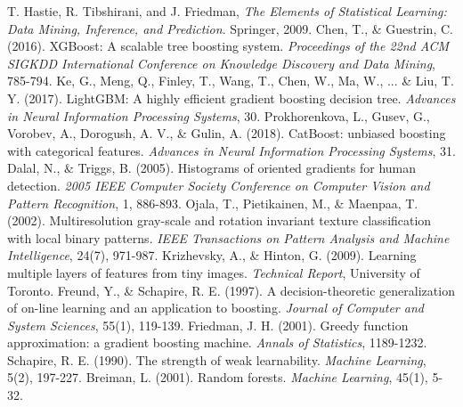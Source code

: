 \documentclass[UTF8]{report}
\theoremstyle{MyLineTheoremStyle} %
\theoremstyle{MyBlockTheoremStyle} %
\theoremstyle{MySubsubsectionStyle} %
\begin{document}
\begin{thebibliography}{99}
T. Hastie, R. Tibshirani, and J. Friedman, \textit{The Elements of Statistical Learning: Data Mining, Inference, and Prediction}. Springer, 2009.
     Chen, T., \& Guestrin, C. (2016). XGBoost: A scalable tree boosting system. \textit{Proceedings of the 22nd ACM SIGKDD International Conference on Knowledge Discovery and Data Mining}, 785-794.
     Ke, G., Meng, Q., Finley, T., Wang, T., Chen, W., Ma, W., ... \& Liu, T. Y. (2017). LightGBM: A highly efficient gradient boosting decision tree. \textit{Advances in Neural Information Processing Systems}, 30.
     Prokhorenkova, L., Gusev, G., Vorobev, A., Dorogush, A. V., \& Gulin, A. (2018). CatBoost: unbiased boosting with categorical features. \textit{Advances in Neural Information Processing Systems}, 31.
     Dalal, N., \& Triggs, B. (2005). Histograms of oriented gradients for human detection. \textit{2005 IEEE Computer Society Conference on Computer Vision and Pattern Recognition}, 1, 886-893.
     Ojala, T., Pietikainen, M., \& Maenpaa, T. (2002). Multiresolution gray-scale and rotation invariant texture classification with local binary patterns. \textit{IEEE Transactions on Pattern Analysis and Machine Intelligence}, 24(7), 971-987.
     Krizhevsky, A., \& Hinton, G. (2009). Learning multiple layers of features from tiny images. \textit{Technical Report}, University of Toronto.
     Freund, Y., \& Schapire, R. E. (1997). A decision-theoretic generalization of on-line learning and an application to boosting. \textit{Journal of Computer and System Sciences}, 55(1), 119-139.
     Friedman, J. H. (2001). Greedy function approximation: a gradient boosting machine. \textit{Annals of Statistics}, 1189-1232.
     Schapire, R. E. (1990). The strength of weak learnability. \textit{Machine Learning}, 5(2), 197-227.
     Breiman, L. (2001). Random forests. \textit{Machine Learning}, 45(1), 5-32.
\end{thebibliography}
\end{document}
